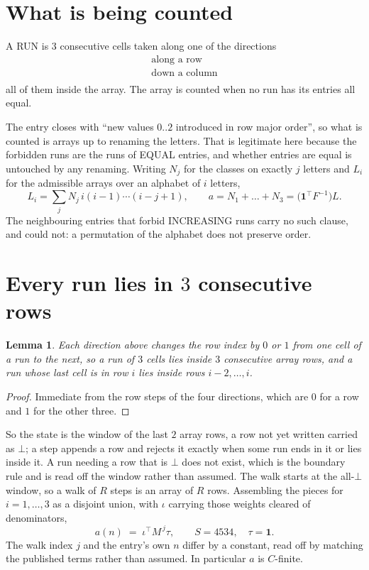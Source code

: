 \documentclass[11pt,a4paper]{article}
\theoremstyle{plain}
\newtheorem{lemma}[theorem]{Lemma}
\theoremstyle{definition}
\begin{document}
\section{What is being counted}

A RUN is $3$ consecutive cells taken along one of the directions
\[
\begin{array}{l}
\text{along a row} \\
\text{down a column} \\
\end{array}
\]
all of them inside the array. The array is counted when no run has its entries all equal.


The entry closes with ``new values $0..2$ introduced in row major order'', so what is counted
is arrays up to renaming the letters. That is legitimate here because the forbidden runs are
the runs of EQUAL entries, and whether entries are equal is untouched by any renaming. Writing
$N_j$ for the classes on exactly $j$ letters and $L_i$ for the admissible arrays over an
alphabet of $i$ letters,
\[
L_i=\sum_j N_j\,i(i-1)\cdots(i-j+1),\qquad
a=N_1+\dots+N_{3}=\bigl(\mathbf{1}^{\!\top}F^{-1}\bigr)L .
\]
The neighbouring entries that forbid INCREASING runs carry no such clause, and could not: a
permutation of the alphabet does not preserve order.

\section{Every run lies in $3$ consecutive rows}

\begin{lemma}\label{lem:win}
Each direction above changes the row index by $0$ or $1$ from one cell of a run to the next, so
a run of $3$ cells lies inside $3$ consecutive array rows, and a run whose last cell is in
row $i$ lies inside rows $i-2,\dots,i$.
\end{lemma}

\begin{proof}
Immediate from the row steps of the four directions, which are $0$ for a row and $1$ for the
other three.
\end{proof}

So the state is the window of the last $2$ array rows, a row not yet written carried as
$\bot$; a step appends a row and rejects it exactly when some run ends in it or lies inside it.
A run needing a row that is $\bot$ does not exist, which is the boundary rule and is read off
the window rather than assumed. The walk starts at the all-$\bot$ window, so a walk of $R$ steps
is an array of $R$ rows. Assembling the pieces for $i=1,\dots,3$ as a disjoint union, with $\iota$ carrying those weights cleared of denominators,
\[
a(n)\;=\;\iota^{\!\top}M^{\,j}\tau ,\qquad S=4534,\quad\tau=\mathbf{1} .
\]
The walk index $j$ and the entry's own $n$ differ by a constant, read off by matching the
published terms rather than assumed. In particular $a$ is $C$-finite.
\end{document}
